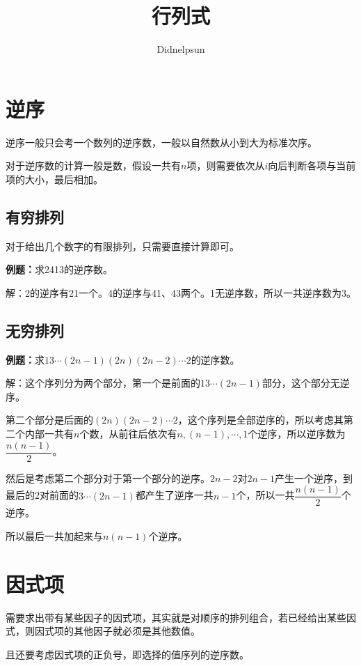\documentclass[UTF8, 12pt]{ctexart}
\author{Didnelpsun}
\title{行列式}
\date{}
\begin{document}
\maketitle
\pagestyle{empty}
\thispagestyle{empty}
\tableofcontents
\thispagestyle{empty}
\newpage
\pagestyle{plain}
\setcounter{page}{1}
\section{逆序}

逆序一般只会考一个数列的逆序数，一般以自然数从小到大为标准次序。

对于逆序数的计算一般是数，假设一共有$n$项，则需要依次从$i$向后判断各项与当前项的大小，最后相加。

\subsection{有穷排列}

对于给出几个数字的有限排列，只需要直接计算即可。

\textbf{例题：}求2413的逆序数。

解：2的逆序有21一个。4的逆序与41、43两个。1无逆序数，所以一共逆序数为3。

\subsection{无穷排列}

\textbf{例题：}求$13\cdots(2n-1)(2n)(2n-2)\cdots2$的逆序数。

解：这个序列分为两个部分，第一个是前面的$13\cdots(2n-1)$部分，这个部分无逆序。

第二个部分是后面的$(2n)(2n-2)\cdots2$，这个序列是全部逆序的，所以考虑其第二个内部一共有$n$个数，从前往后依次有$n,(n-1),\cdots,1$个逆序，所以逆序数为$\dfrac{n(n-1)}{2}$。

然后是考虑第二个部分对于第一个部分的逆序。$2n-2$对$2n-1$产生一个逆序，到最后的2对前面的$3\cdots(2n-1)$都产生了逆序一共$n-1$个，所以一共$\dfrac{n(n-1)}{2}$个逆序。

所以最后一共加起来与$n(n-1)$个逆序。

\section{因式项}

需要求出带有某些因子的因式项，其实就是对顺序的排列组合，若已经给出某些因式，则因式项的其他因子就必须是其他数值。

且还要考虑因式项的正负号，即选择的值序列的逆序数。
\end{document}
